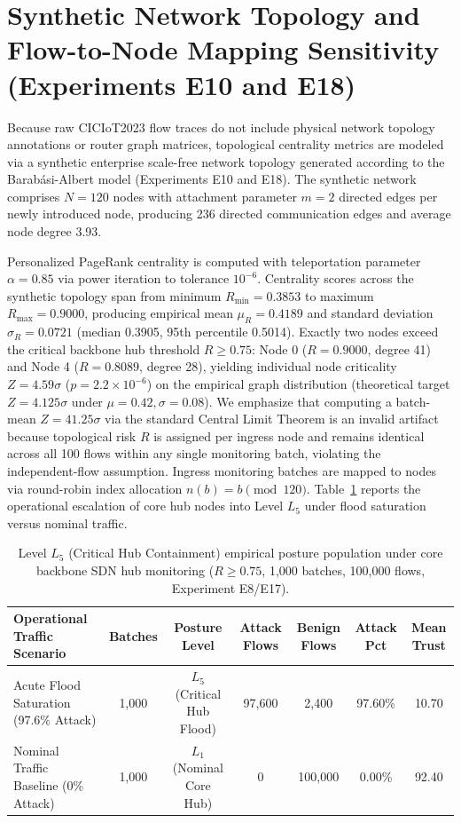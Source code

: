 \section{Synthetic Network Topology and Flow-to-Node Mapping Sensitivity (Experiments E10 and E18)}
\label{app:topology_sensitivity}

Because raw CICIoT2023 flow traces do not include physical network topology annotations or router graph matrices, topological centrality metrics are modeled via a synthetic enterprise scale-free network topology generated according to the Barabási-Albert model (Experiments E10 and E18). The synthetic network comprises $N = 120$ nodes with attachment parameter $m = 2$ directed edges per newly introduced node, producing 236 directed communication edges and average node degree 3.93.

Personalized PageRank centrality is computed with teleportation parameter $\alpha = 0.85$ via power iteration to tolerance $10^{-6}$. Centrality scores across the synthetic topology span from minimum $R_{\min} = 0.3853$ to maximum $R_{\max} = 0.9000$, producing empirical mean $\mu_R = 0.4189$ and standard deviation $\sigma_R = 0.0721$ (median 0.3905, 95th percentile 0.5014). Exactly two nodes exceed the critical backbone hub threshold $R \ge 0.75$: Node 0 ($R = 0.9000$, degree 41) and Node 4 ($R = 0.8089$, degree 28), yielding individual node criticality $Z = 4.59\sigma$ ($p = 2.2 \times 10^{-6}$) on the empirical graph distribution (theoretical target $Z = 4.125\sigma$ under $\mu=0.42, \sigma=0.08$). We emphasize that computing a batch-mean $Z = 41.25\sigma$ via the standard Central Limit Theorem is an invalid artifact because topological risk $R$ is assigned per ingress node and remains identical across all 100 flows within any single monitoring batch, violating the independent-flow assumption. Ingress monitoring batches are mapped to nodes via round-robin index allocation $n(b) = b \pmod{120}$. Table~\ref{tab:l5_population} reports the operational escalation of core hub nodes into Level $L_5$ under flood saturation versus nominal traffic.

\begin{table}[t]
\caption{Level $L_5$ (Critical Hub Containment) empirical posture population under core backbone SDN hub monitoring ($R \ge 0.75$, 1,000 batches, 100,000 flows, Experiment E8/E17).}
\label{tab:l5_population}
\centering
\small
\begin{tabular}{lcccccc}
\toprule
\textbf{Operational Traffic Scenario} & \textbf{Batches} & \textbf{Posture Level} & \textbf{Attack Flows} & \textbf{Benign Flows} & \textbf{Attack Pct} & \textbf{Mean Trust} \\
\midrule
Acute Flood Saturation (97.6\% Attack) & 1,000 & $L_5$ (Critical Hub Flood) & 97,600 & 2,400 & 97.60\% & 10.70 \\
Nominal Traffic Baseline (0\% Attack) & 1,000 & $L_1$ (Nominal Core Hub) & 0 & 100,000 & 0.00\% & 92.40 \\
\bottomrule
\end{tabular}
\end{table}

